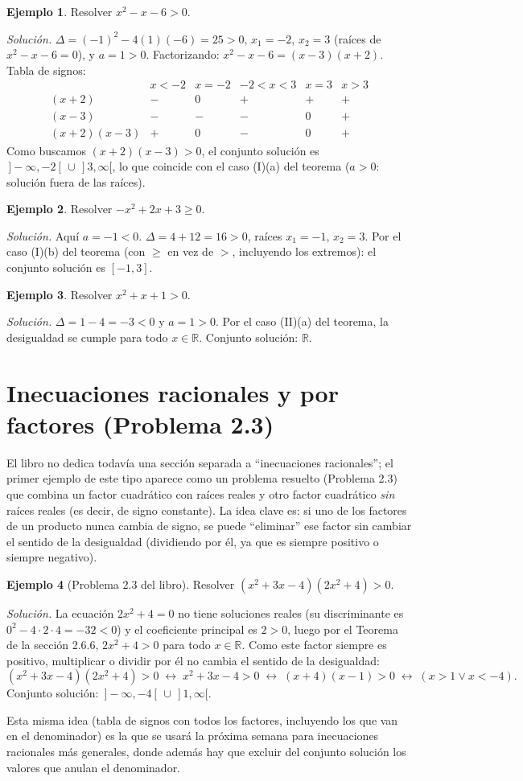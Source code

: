 \documentclass[11pt]{article}
\theoremstyle{plain}
\theoremstyle{definition}
\newtheorem{ejemplo}{Ejemplo}
\begin{document}
\begin{ejemplo}
Resolver $x^2-x-6>0$.

\emph{Solución.} $\Delta = (-1)^2-4(1)(-6)=25>0$, $x_1=-2$, $x_2=3$ (raíces de $x^2-x-6=0$), y
$a=1>0$. Factorizando: $x^2-x-6=(x-3)(x+2)$. Tabla de signos:
\[
\begin{array}{c|ccccc}
  & x<-2 & x=-2 & -2<x<3 & x=3 & x>3 \\\hline
  (x+2) & - & 0 & + & + & + \\
  (x-3) & - & - & - & 0 & + \\\hline
  (x+2)(x-3) & + & 0 & - & 0 & +
\end{array}
\]
Como buscamos $(x+2)(x-3)>0$, el conjunto solución es $\,]-\infty,-2[\, \cup \,]3,\infty[$, lo que
coincide con el caso (I)(a) del teorema ($a>0$: solución fuera de las raíces).
\end{ejemplo}

\begin{ejemplo}
Resolver $-x^2+2x+3 \ge 0$.

\emph{Solución.} Aquí $a=-1<0$. $\Delta=4+12=16>0$, raíces $x_1=-1$, $x_2=3$. Por el caso (I)(b)
del teorema (con $\ge$ en vez de $>$, incluyendo los extremos): el conjunto solución es $[-1,3]$.
\end{ejemplo}

\begin{ejemplo}
Resolver $x^2+x+1>0$.

\emph{Solución.} $\Delta = 1-4=-3<0$ y $a=1>0$. Por el caso (II)(a) del teorema, la desigualdad se
cumple para todo $x\in\mathbb{R}$. Conjunto solución: $\mathbb{R}$.
\end{ejemplo}

\section{Inecuaciones racionales y por factores (Problema 2.3)}

El libro no dedica todavía una sección separada a ``inecuaciones racionales''; el primer ejemplo de
este tipo aparece como un problema resuelto (Problema 2.3) que combina un factor cuadrático con
raíces reales y otro factor cuadrático \emph{sin} raíces reales (es decir, de signo constante). La
idea clave es: si uno de los factores de un producto nunca cambia de signo, se puede ``eliminar''
ese factor sin cambiar el sentido de la desigualdad (dividiendo por él, ya que es siempre positivo o
siempre negativo).

\begin{ejemplo}[Problema 2.3 del libro]
Resolver $(x^2+3x-4)(2x^2+4)>0$.

\emph{Solución.} La ecuación $2x^2+4=0$ no tiene soluciones reales (su discriminante es
$0^2-4\cdot2\cdot4=-32<0$) y el coeficiente principal es $2>0$, luego por el Teorema de la sección
2.6.6, $2x^2+4>0$ para todo $x\in\mathbb{R}$. Como este factor siempre es positivo, multiplicar o
dividir por él no cambia el sentido de la desigualdad:
\[
  (x^2+3x-4)(2x^2+4)>0 \;\leftrightarrow\; x^2+3x-4>0 \;\leftrightarrow\; (x+4)(x-1)>0
  \;\leftrightarrow\; (x>1 \lor x<-4).
\]
Conjunto solución: $\,]-\infty,-4[\, \cup \,]1,\infty[$.
\end{ejemplo}

Esta misma idea (tabla de signos con todos los factores, incluyendo los que van en el denominador)
es la que se usará la próxima semana para inecuaciones racionales más generales, donde además hay
que excluir del conjunto solución los valores que anulan el denominador.
\end{document}
